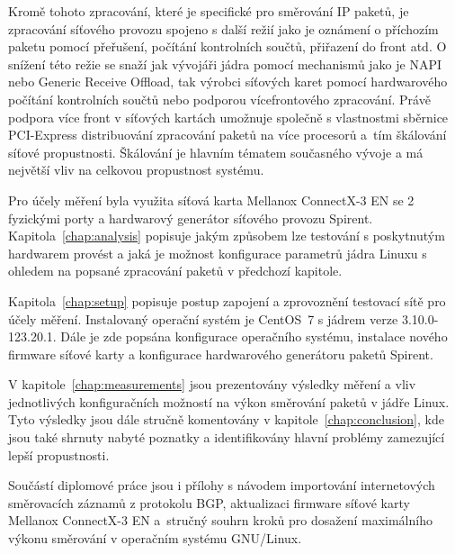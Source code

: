 \documentclass[english]{fitthesis} %
\begin{document}
Kromě tohoto zpracování, které je specifické pro směrování IP paketů, je zpracování síťového provozu
spojeno s další režií jako je oznámení o příchozím paketu pomocí přeřušení,
počítání kontrolních součtů, přiřazení do front atd.
O snížení této režie se snaží jak vývojáři jádra pomocí mechanismů jako je NAPI nebo Generic Receive Offload,
tak výrobci síťových karet pomocí hardwarového počítání kontrolních součtů nebo podporou vícefrontového zpracování.
Právě podpora více front v síťových kartách umožnuje společně s vlastnostmi sběrnice PCI-Express
distribuování zpracování paketů na více procesorů a~tím škálování síťové propustnosti.
Škálování je hlavním tématem současného vývoje a má největší vliv na celkovou propustnost systému.

Pro účely měření byla využita síťová karta Mellanox ConnectX-3 EN se 2 fyzickými porty
a hardwarový generátor síťového provozu Spirent.
Kapitola~\ref{chap:analysis} popisuje jakým způsobem lze testování s poskytnutým hardwarem provést
a jaká je možnost konfigurace parametrů jádra Linuxu s ohledem na popsané zpracování paketů v předchozí kapitole.

Kapitola~\ref{chap:setup} popisuje postup zapojení a zprovoznění testovací sítě pro účely měření.
Instalovaný operační systém je CentOS~7 s jádrem verze 3.10.0-123.20.1. %
Dále je zde popsána konfigurace operačního systému, instalace nového firmware síťové karty a konfigurace hardwarového generátoru
paketů Spirent.

V kapitole~\ref{chap:measurements} jsou prezentovány výsledky měření a vliv jednotlivých konfiguračních možností
na výkon směrování paketů v jádře Linux.
Tyto výsledky jsou dále stručně komentovány v kapitole~\ref{chap:conclusion}, kde jsou také shrnuty nabyté poznatky
a identifikovány hlavní problémy zamezující lepší propustnosti.

Součástí diplomové práce jsou i přílohy s návodem importování internetových směrovacích záznamů z protokolu BGP,
aktualizaci firmware síťové karty Mellanox ConnectX-3 EN
a~stručný souhrn kroků pro dosažení maximálního výkonu směrování v operačním systému GNU/Linux.

  \setcounter{tocdepth}{1}
  \tableofcontents
  


\ifczech
  
\else 
  
%  
\fi
  \begin{flushleft}
  \end{flushleft}
  \appendix
  
\end{document}
